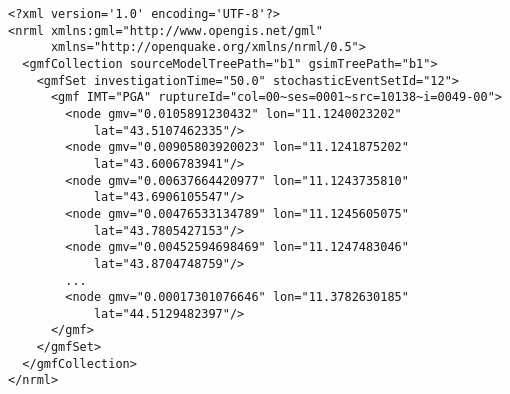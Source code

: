 \begin{Verbatim}[frame=single, commandchars=\\\{\}, fontsize=\small]
<?xml version='1.0' encoding='UTF-8'?>
<nrml xmlns:gml="http://www.opengis.net/gml"
      xmlns="http://openquake.org/xmlns/nrml/0.5">
  <gmfCollection sourceModelTreePath="b1" gsimTreePath="b1">
    <gmfSet investigationTime="50.0" stochasticEventSetId="12">
      <gmf IMT="PGA" ruptureId="col=00~ses=0001~src=10138~i=0049-00">
        <node gmv="0.0105891230432" lon="11.1240023202"
            lat="43.5107462335"/>
        <node gmv="0.00905803920023" lon="11.1241875202"
            lat="43.6006783941"/>
        <node gmv="0.00637664420977" lon="11.1243735810"
            lat="43.6906105547"/>
        <node gmv="0.00476533134789" lon="11.1245605075"
            lat="43.7805427153"/>
        <node gmv="0.00452594698469" lon="11.1247483046"
            lat="43.8704748759"/>
        ...
        <node gmv="0.00017301076646" lon="11.3782630185"
            lat="44.5129482397"/>
      </gmf>
    </gmfSet>
  </gmfCollection>
</nrml>
\end{Verbatim}